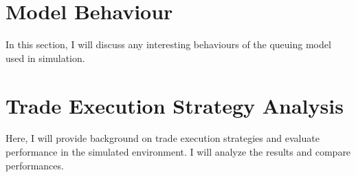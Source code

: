 \section{Model Behaviour}
In this section, I will discuss any interesting behaviours of the queuing model used in simulation.
\section{Trade Execution Strategy Analysis}
Here, I will provide background on trade execution strategies and evaluate performance in the simulated environment. I will analyze the results and compare performances.

